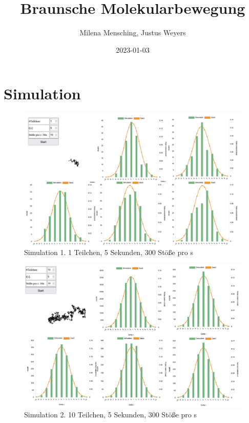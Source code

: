 \documentclass[
  9pt,
]{article}
\title{Braunsche Molekularbewegung}
\author{Milena Mensching, Justus Weyers}
\date{2023-01-03}
\begin{document}
\maketitle

\hypertarget{simulation}{%
\section{Simulation}\label{simulation}}

\begin{figure}
\centering
\includegraphics[width=\textwidth,height=0.1\textheight]{Daten/a.png}
\caption{Simulation 1. 1 Teilchen, 5 Sekunden, 300 Stöße pro s}
\end{figure}

\begin{figure}
\centering
\includegraphics[width=\textwidth,height=0.1\textheight]{Daten/b.png}
\caption{Simulation 2. 10 Teilchen, 5 Sekunden, 300 Stöße pro s}
\end{figure}
\end{document}
